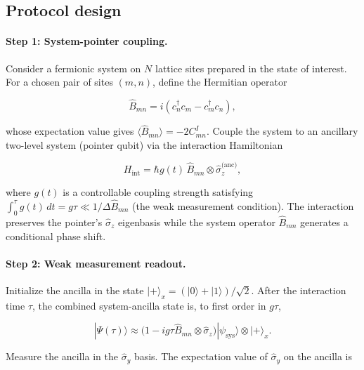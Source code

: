 \documentclass[aps,pra,preprint,groupedaddress,amsmath,amssymb,floatfix]{revtex4-2}
\begin{document}
\subsection{Protocol design}
\label{sec:protocol_design}

\paragraph{Step 1: System-pointer coupling.}
Consider a fermionic system on $N$ lattice sites prepared in the state of interest. For a chosen pair of sites $(m,n)$, define the Hermitian operator

\begin{equation}
\hat{B}_{mn} = i(c^\dagger_n c_m - c^\dagger_m c_n),
\label{eq:B_operator}
\end{equation}

whose expectation value gives $\langle \hat{B}_{mn} \rangle = -2 C^I_{mn}$. Couple the system to an ancillary two-level system (pointer qubit) via the interaction Hamiltonian

\begin{equation}
H_{\text{int}} = \hbar g(t)\, \hat{B}_{mn} \otimes \hat{\sigma}_z^{\text{(anc)}},
\label{eq:int_Hamiltonian}
\end{equation}

where $g(t)$ is a controllable coupling strength satisfying $\int_0^\tau g(t)\,dt = g\tau \ll 1/\Delta \hat{B}_{mn}$ (the weak measurement condition). The interaction preserves the pointer's $\hat{\sigma}_z$ eigenbasis while the system operator $\hat{B}_{mn}$ generates a conditional phase shift.

\paragraph{Step 2: Weak measurement readout.}
Initialize the ancilla in the state $|+\rangle_x = (|0\rangle + |1\rangle)/\sqrt{2}$. After the interaction time $\tau$, the combined system-ancilla state is, to first order in $g\tau$,

\begin{equation}
|\Psi(\tau)\rangle \approx \bigl(1 - i g\tau \hat{B}_{mn} \otimes \hat{\sigma}_z\bigr) |\psi_{\text{sys}}\rangle \otimes |+\rangle_x.
\label{eq:weak_state}
\end{equation}

Measure the ancilla in the $\hat{\sigma}_y$ basis. The expectation value of $\hat{\sigma}_y$ on the ancilla is
\end{document}
